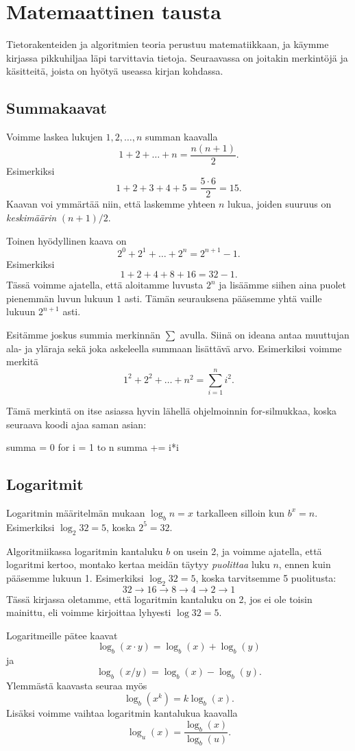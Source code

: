 \section{Matemaattinen tausta}

Tietorakenteiden ja algoritmien teoria perustuu matematiikkaan,
ja käym\-me kirjassa pikkuhiljaa läpi tarvittavia tietoja.
Seuraavassa on joitakin merkintöjä ja käsitteitä, joista on hyötyä
useassa kirjan kohdassa.

\subsection{Summakaavat}

Voimme laskea lukujen $1,2,\dots,n$ summan kaavalla
\[1+2+\dots+n = \frac{n(n+1)}{2}.\]
Esimerkiksi
\[1+2+3+4+5 = \frac{5 \cdot 6}{2}=15.\]
Kaavan voi ymmärtää niin, että laskemme yhteen $n$ lukua,
joiden suuruus on \emph{keskimäärin} $(n+1)/2$.

Toinen hyödyllinen kaava on
\[2^0+2^1+\dots+2^n = 2^{n+1}-1.\]
Esimerkiksi
\[1+2+4+8+16=32-1.\]
Tässä voimme ajatella, että aloitamme luvusta $2^n$
ja lisäämme siihen aina puolet pienemmän luvun lukuun $1$ asti.
Tämän seurauksena pääsemme yhtä vaille lukuun $2^{n+1}$ asti.

Esitämme joskus summia merkinnän $\sum$ avulla.
Siinä on ideana antaa muuttujan ala- ja yläraja sekä
joka askeleella summaan lisättävä arvo.
Esimerkiksi voimme merkitä
\[1^2 + 2^2 + \dots + n^2 = \sum_{i=1}^n i^2.\]

Tämä merkintä on itse asiassa hyvin lähellä ohjelmoinnin
for-silmukkaa, koska seuraava koodi ajaa saman asian:

\begin{code}
summa = 0
for i = 1 to n
    summa += i*i
\end{code}

\subsection{Logaritmit}

Logaritmin määritelmän mukaan $\log_b n =x$
tarkalleen silloin kun $b^x=n$.
Esimerkiksi $\log_2 32=5$, koska $2^5=32$.

Algoritmiikassa logaritmin kantaluku $b$ on usein 2,
ja voimme ajatella, että logaritmi kertoo, montako kertaa
meidän täytyy \emph{puolittaa} luku $n$, ennen kuin pääsemme lukuun 1.
Esimerkiksi $\log_2 32 =5$, koska tarvitsemme 5 puolitusta:
\[32 \rightarrow 16 \rightarrow 8 \rightarrow 4 \rightarrow 2 \rightarrow 1\]
Tässä kirjassa oletamme, että logaritmin kantaluku on 2,
jos ei ole toisin mainittu,
eli voimme kirjoittaa lyhyesti $\log 32 = 5$.

Logaritmeille pätee kaavat
\[\log_b(x \cdot y) = \log_b(x)+\log_b(y)\]
ja
\[\log_b(x / y) = \log_b(x)-\log_b(y).\]
Ylemmästä kaavasta seuraa myös
\[\log_b(x^k) = k \log_b(x).\]
Lisäksi voimme vaihtaa logaritmin kantalukua kaavalla
\[\log_u(x) = \frac{\log_b(x)}{\log_b(u)}.\]